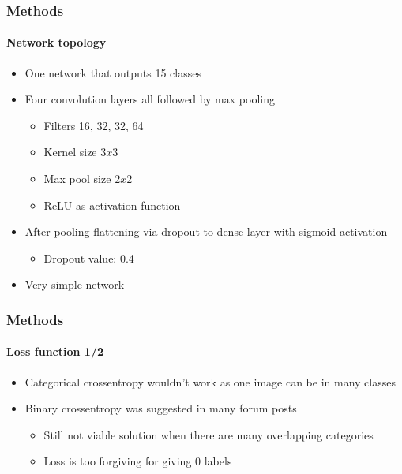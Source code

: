 \begin{frame}
	\frametitle{Methods}
	\framesubtitle{Network topology}
	\begin{itemize}
		\item One network that outputs 15 classes
		\item Four convolution layers all followed by max pooling
		\begin{itemize}
			\item Filters 16, 32, 32, 64
			\item Kernel size $3 x 3$
			\item Max pool size $2 x 2$
			\item ReLU as activation function
		\end{itemize}
		\item After pooling flattening via dropout to dense layer with sigmoid activation
		\begin{itemize}
			\item Dropout value: 0.4
		\end{itemize}
		\item Very simple network
	\end{itemize}
\end{frame}

\begin{frame}
	\frametitle{Methods}
	\framesubtitle{Loss function 1/2}	
	\begin{itemize}
		\item Categorical crossentropy wouldn't work as one image can be in many classes
		\item Binary crossentropy was suggested in many forum posts				
			\begin{itemize}
				\item Still not viable solution when there are many overlapping categories
				\item Loss is too forgiving for giving 0 labels
			\end{itemize}
	\end{itemize}
\end{frame}

